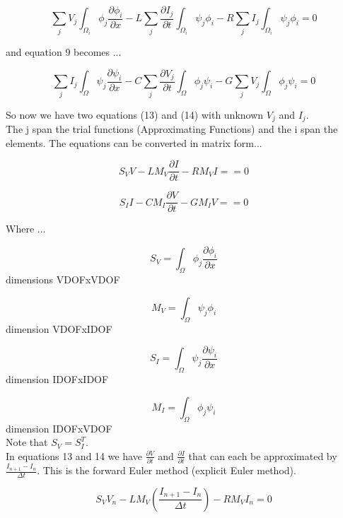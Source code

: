 \documentclass[12pt, letterpaper]{article}
\begin{document}
\begin{equation}
	\sum_j V_j \int_{\Omega_i}\phi_j \frac{\partial{\phi_i}}{\partial{x}} 
	- L \sum_j \frac{\partial{I_j}}{\partial t} \int_{\Omega_i} \psi_j \phi_i
	-  R \sum_j I_j \int_{\Omega_i} \psi_j \phi_i
	= 0
\end{equation}

and equation 9 becomes ...

\begin{equation}
	\sum_j I_j  \int_\Omega \psi_j \frac{\partial{\psi_i}}{\partial{x}}
	- C \sum_j \frac{\partial{V_j}}{\partial{t}} \int_\Omega \phi_j \psi_i
	- G \sum_j V_j \int_\Omega \phi_j \psi_i
	= 0
\end{equation}

So now we have two equations (13) and (14) with unknown $V_j$ and $I_j$.\\

The j span the trial functions (Approximating Functions) and the i span the elements. The equations can be converted in matrix form...

\begin{equation}
	S_V V - L M_V \frac{\partial I}{\partial t} - R M_V I = 
	= 0
\end{equation}

\begin{equation}
	S_I I - C M_I \frac{\partial V}{\partial t} - G M_I V = 
	= 0
\end{equation}

Where ...

\[S_V = \int_\Omega \phi_j \frac{\partial \phi_i}{\partial x}\]
dimensions VDOFxVDOF

\[M_V = \int_\Omega \psi_j \phi_i\]
dimension VDOFxIDOF

\[S_I = \int_\Omega \psi_j \frac{\partial \psi_i}{\partial x}\]
dimension IDOFxIDOF

\[M_I = \int_\Omega \phi_j \psi_i\]
dimension IDOFxVDOF\\

Note that $S_V = S_I^T$.\\

In equations 13 and 14 we have $\frac{\partial V}{\partial t}$ and $\frac{\partial I}{\partial t}$ that can each be approximated by $\frac{I_{n+1}-I_n}{\Delta t}$. This is the forward Euler method (explicit Euler method).

\begin{equation}
	S_V V_n - L M_V (\frac{I_{n+1}-I_n}{\Delta t}) - R M_V I_n
	= 0
\end{equation}
\end{document}

